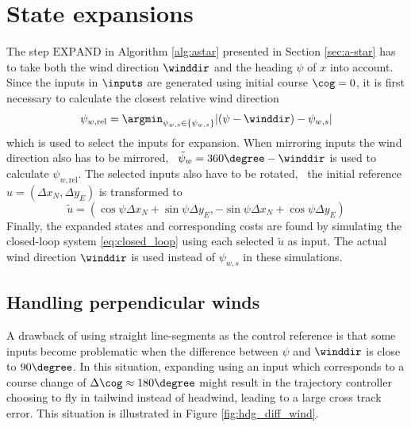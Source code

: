 \section{State expansions}
The step $\text{EXPAND}$ in Algorithm \ref{alg:astar} presented in Section \ref{sec:a-star} has to take both the wind direction $\winddir$ and the heading $\psi$ of $x$ into account. 
Since the inputs in $\inputs$ are generated using initial course $\cog=0$, it is first necessary to calculate the closest relative wind direction
\begin{equation}
    \psi_{w,\text{rel}}=\argmin_{\psi_{w,s}\in\{\psi_{w,s}\}}|(\psi-\winddir)-\psi_{w,s}|
\end{equation}
which is used to select the inputs for expansion. When mirroring inputs the wind direction also has to be mirrored, \ie\ 
$\tilde{\psi}_w=360\degree-\winddir$ is used to calculate $\psi_{w,\text{rel}}$. The selected inputs also have to be rotated, \ie\ the initial reference $u=(\Delta x_N, \Delta y_E)$ is transformed to 
\begin{equation}
    \tilde{u}=(\cos\psi \Delta x_N + \sin\psi \Delta y_E, -\sin\psi \Delta x_N + \cos\psi \Delta y_E)
\end{equation}
Finally, the expanded states and corresponding costs are found by simulating the closed-loop system \eqref{eq:closed_loop} using each selected $\tilde{u}$ as input. 
The actual wind direction $\winddir$ is used instead of $\psi_{w,s}$ in these simulations.

\subsection{Handling perpendicular winds}
A drawback of using straight line-segments as the control reference is that some inputs become problematic when the difference between 
$\psi$ and $\winddir$ is close to $90 \degree$. In this situation, expanding using an input which corresponds to a course change 
 of $\Delta\cog\approx180\degree$ might result in the trajectory controller choosing to fly in tailwind instead of headwind, leading to a large cross track error. This situation is 
 illustrated in Figure \ref{fig:hdg_diff_wind}.

